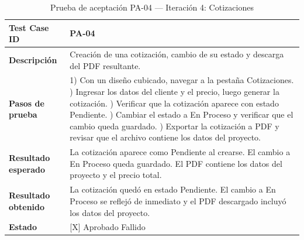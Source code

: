 ﻿\documentclass{iccmemoria}
\begin{document}
\begin{table}[H]
\centering
\caption{Prueba de aceptación PA-04 — Iteración 4: Cotizaciones}
\label{tab:pa04}
\begin{tabular}{|p{4cm}|p{9.5cm}|}
\hline
\textbf{Test Case ID} & PA-04 \\
\hline
\textbf{Descripción} & Creación de una cotización, cambio de su estado y descarga del PDF resultante. \\
\hline
\textbf{Pasos de prueba} &
1) Con un diseño cubicado, navegar a la pestaña Cotizaciones. \newline
2) Ingresar los datos del cliente y el precio, luego generar la cotización. \newline
3) Verificar que la cotización aparece con estado Pendiente. \newline
4) Cambiar el estado a En Proceso y verificar que el cambio queda guardado. \newline
5) Exportar la cotización a PDF y revisar que el archivo contiene los datos del proyecto. \\
\hline
\textbf{Resultado esperado} & La cotización aparece como Pendiente al crearse. El cambio a En Proceso queda guardado. El PDF contiene los datos del proyecto y el precio total. \\
\hline
\textbf{Resultado obtenido} & La cotización quedó en estado Pendiente. El cambio a En Proceso se reflejó de inmediato y el PDF descargado incluyó los datos del proyecto. \\
\hline
\textbf{Estado} & {[X]} Aprobado \quad {[ ]} Fallido \\
\hline
\end{tabular}
\end{table}
\end{document}
